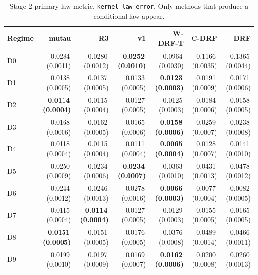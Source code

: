 \begin{table}[htbp]
\centering
\caption{Stage 2 primary law metric, \texttt{kernel\_law\_error}. Only methods that produce a conditional law appear.}
\label{tab:p55s2-kernel}
\scriptsize
\setlength{\tabcolsep}{3.2pt}
\begin{tabular}{@{}lrrrrrr@{}}
\toprule
Regime & mutau & R3 & v1 & W-DRF-T & C-DRF & DRF \\
\midrule
D0 & 0.0284\,(0.0011) & 0.0280\,(0.0012) & \textbf{0.0252\,(0.0010)} & 0.0964\,(0.0030) & 0.1166\,(0.0035) & 0.1365\,(0.0044) \\
D1 & 0.0138\,(0.0005) & 0.0137\,(0.0005) & 0.0133\,(0.0005) & \textbf{0.0123\,(0.0003)} & 0.0191\,(0.0009) & 0.0171\,(0.0006) \\
D2 & \textbf{0.0114\,(0.0004)} & 0.0115\,(0.0004) & 0.0127\,(0.0005) & 0.0125\,(0.0003) & 0.0184\,(0.0006) & 0.0158\,(0.0005) \\
D3 & 0.0168\,(0.0006) & 0.0162\,(0.0005) & 0.0165\,(0.0006) & \textbf{0.0158\,(0.0006)} & 0.0259\,(0.0007) & 0.0238\,(0.0008) \\
D4 & 0.0118\,(0.0004) & 0.0115\,(0.0004) & 0.0111\,(0.0004) & \textbf{0.0065\,(0.0004)} & 0.0128\,(0.0007) & 0.0141\,(0.0010) \\
D5 & 0.0250\,(0.0009) & 0.0234\,(0.0006) & \textbf{0.0234\,(0.0007)} & 0.0363\,(0.0010) & 0.0431\,(0.0013) & 0.0478\,(0.0012) \\
D6 & 0.0244\,(0.0012) & 0.0246\,(0.0013) & 0.0278\,(0.0016) & \textbf{0.0066\,(0.0003)} & 0.0077\,(0.0004) & 0.0082\,(0.0005) \\
D7 & 0.0115\,(0.0004) & \textbf{0.0114\,(0.0004)} & 0.0127\,(0.0005) & 0.0129\,(0.0003) & 0.0155\,(0.0005) & 0.0165\,(0.0005) \\
D8 & \textbf{0.0151\,(0.0005)} & 0.0151\,(0.0005) & 0.0176\,(0.0005) & 0.0376\,(0.0008) & 0.0489\,(0.0014) & 0.0466\,(0.0011) \\
D9 & 0.0199\,(0.0010) & 0.0197\,(0.0009) & 0.0169\,(0.0007) & \textbf{0.0162\,(0.0006)} & 0.0200\,(0.0008) & 0.0260\,(0.0013) \\
\bottomrule
\end{tabular}
\end{table}

